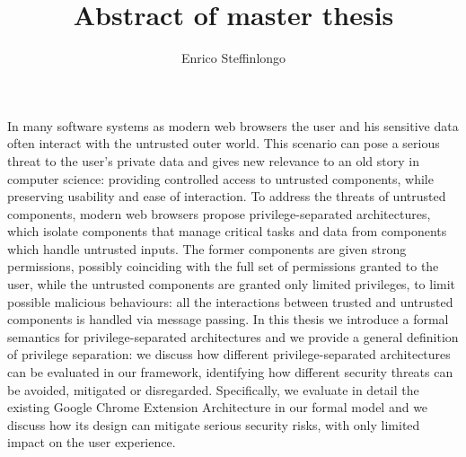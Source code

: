 \documentclass[12pt,a4paper]{article}
\title{Abstract of master thesis}
\author{Enrico Steffinlongo}
\begin{document}
\maketitle
In many software systems as modern web browsers the user and his sensitive data often interact with the untrusted outer world. This scenario can pose a serious threat to the user's private data and gives new relevance to an old story in computer science: providing controlled access to untrusted components, while preserving usability and ease of interaction. To address the threats of untrusted components, modern web browsers propose privilege-separated architectures, which isolate components that manage critical tasks and data from components which handle untrusted inputs. The former components are given strong permissions, possibly coinciding with the full set of permissions granted to the user, while the untrusted components are granted only limited privileges, to limit possible malicious behaviours: all the interactions between trusted and untrusted components is handled via message passing. In this thesis we introduce a formal semantics for privilege-separated architectures and we provide a general definition of privilege separation: we discuss how different privilege-separated architectures can be evaluated in our framework, identifying how different security threats can be avoided, mitigated or disregarded. Specifically, we evaluate in detail the existing Google Chrome Extension Architecture in our formal model and we discuss how its design can mitigate serious security risks, with only limited impact on the user experience. 
\end{document}
